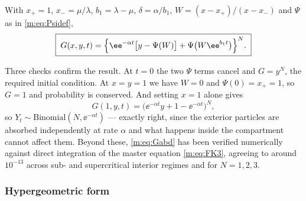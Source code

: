 \begin{proposition}
\label{m:prop:Gabd}
With $x_+=1$, $x_-=\mu/\lambda$, $b_1 = \lambda-\mu$, $\delta = \alpha/b_1$,
$W = (x-x_+)/(x-x_-)$ and $\Psi$ as in \cref{m:eq:Psidef},
\begin{equation}
\label{m:eq:Gabd}
\boxed{\;
G(x,y,t) = \Bigl\{\ee^{-\alpha t}\bigl[y-\Psi(W)\bigr] + \Psi\bigl(W\ee^{b_1t}\bigr)\Bigr\}^{N}. \;}
\end{equation}
\end{proposition}

Three checks confirm the result. At $t=0$ the two $\Psi$ terms cancel and $G=y^N$,
the required initial condition. At $x=y=1$ we have $W=0$ and $\Psi(0)=x_+=1$, so
$G=1$ and probability is conserved. And setting $x=1$ alone gives
\begin{equation*}
G(1,y,t) = \bigl(\ee^{-\alpha t}y + 1-\ee^{-\alpha t}\bigr)^N,
\end{equation*}
so $Y_t\sim\text{Binomial}(N,\ee^{-\alpha t})$ --- exactly right, since the
exterior particles are absorbed independently at rate $\alpha$ and what happens
inside the compartment cannot affect them. Beyond these, \cref{m:eq:Gabd} has been
verified numerically against direct integration of the master equation
\cref{m:eq:FK3}, agreeing to around $10^{-13}$ across sub- and supercritical interior
regimes and for $N=1,2,3$.

\subsubsection*{Hypergeometric form}

